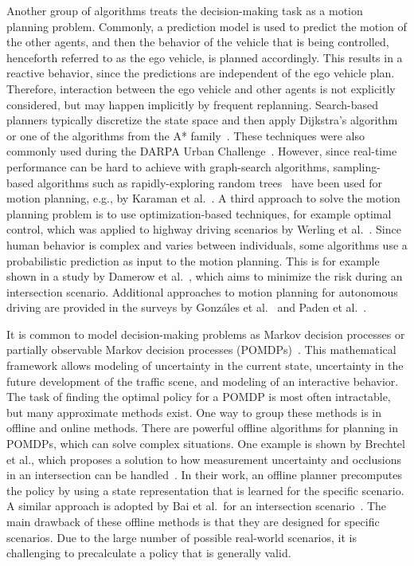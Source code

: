 Another group of algorithms treats the decision-making task as a motion planning problem. Commonly, a prediction model is used to predict the motion of the other agents, and then the behavior of the vehicle that is being controlled, henceforth referred to as the ego vehicle, is planned accordingly. This results in a reactive behavior, since the predictions are independent of the ego vehicle plan. Therefore, interaction between the ego vehicle and other agents is not explicitly considered, but may happen implicitly by frequent replanning.
Search-based planners typically discretize the state space and then apply Dijkstra's algorithm~\cite{Dijkstra1959} or one of the algorithms from the A* family~\cite{Hart1968}. These techniques were also commonly used during the DARPA Urban Challenge~\cite{Bacha2008, darpaStanford}. However, since real-time performance can be hard to achieve with graph-search algorithms, sampling-based algorithms such as rapidly-exploring random trees~\cite{Lavalle1998} have been used for motion planning, e.g., by Karaman et al.~\cite{Karaman2011}. A third approach to solve the motion planning problem is to use optimization-based techniques, for example optimal control, which was applied to highway driving scenarios by Werling et al.~\cite{Werling2010}. Since human behavior is complex and varies between individuals, some algorithms use a probabilistic prediction as input to the motion planning. This is for example shown in a study by Damerow et al.~\cite{Damerow2015}, which aims to minimize the risk during an intersection scenario.
Additional approaches to motion planning for autonomous driving are provided in the surveys by Gonzáles et al.~\cite{Gonzales2016} and Paden et al.~\cite{Paden2016}. 


It is common to model decision-making problems as Markov decision processes or partially observable Markov decision processes (POMDPs)~\cite{Kochenderfer2015}. This mathematical framework allows modeling of uncertainty in the current state, uncertainty in the future development of the traffic scene, and modeling of an interactive behavior. The task of finding the optimal policy for a POMDP is most often intractable, but many approximate methods exist. One way to group these methods is in offline and online methods. There are powerful offline algorithms for planning in POMDPs, which can solve complex situations. One example is shown by Brechtel et al., which proposes a solution to how measurement uncertainty and occlusions in an intersection can be handled~\cite{Brechtel2014}. In their work, an offline planner precomputes the policy by using a state representation that is learned for the specific scenario. A similar approach is adopted by Bai et al.\ for an intersection scenario~\cite{Bai2014}. The main drawback of these offline methods is that they are designed for specific scenarios. Due to the large number of possible real-world scenarios, it is challenging to precalculate a policy that is generally valid.


